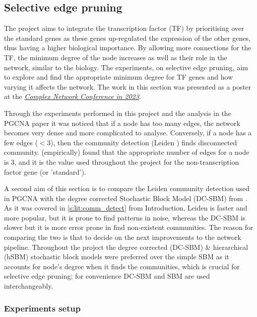 \subsection{Selective edge pruning} \label{s:N_I:sel_pruning}

The project aims to integrate the transcription factor (TF) by prioritising over the standard genes as these genes up-regulated the expression of the other genes, thus having a higher biological importance. By allowing more connections for the TF, the minimum degree of the node increases as well as their role in the network, similar to the biology. The experiments, on selective edge pruning, aim to explore and find the appropriate minimum degree for TF genes and how varying it affects the network. The work in this section was presented as a poster at the \textit{\href{https://2023.complexnetworks.org/}{Complex Network Conference in 2023}}.

Through the experiments performed in this project and the analysis in the PGCNA paper \cite{Care2019-ij} it was noticed that if a node has too many edges, the network becomes very dense and more complicated to analyse. Conversely, if a node has a few edges ($<3$), then the community detection (Leiden \citet{Traag2019-ne}) finds disconnected community. \citet{Care2019-ij} (empirically) found that the appropriate number of edges for a node is 3, and it is the value used throughout the project for the non-transcription factor gene (or 'standard'). 

A second aim of this section is to compare the Leiden \citet{Traag2019-ne} community detection used in PGCNA with the degree corrected Stochastic Block Model (DC-SBM) from \cite{Karrer2011-si, Peixoto2017-gc}. As it was covered in \cref{s:lit:comm_detect} from Introduction, Leiden is faster and more popular, but it is prone to find patterns in noise, whereas the DC-SBM is slower but it is more error prone in find non-existent communities. The reason for comparing the two is that to decide on the next improvements to the network pipeline. Throughout the project the degree corrected (DC-SBM) \& hierarchical (hSBM) stochastic block models were preferred over the simple SBM \cite{Holland1983-eu} as it accounts for node's degree when it finds the communities, which is crucial for selective edge pruning; for convenience DC-SBM and SBM are used interchangeably.

\subsubsection{Experiments setup}


